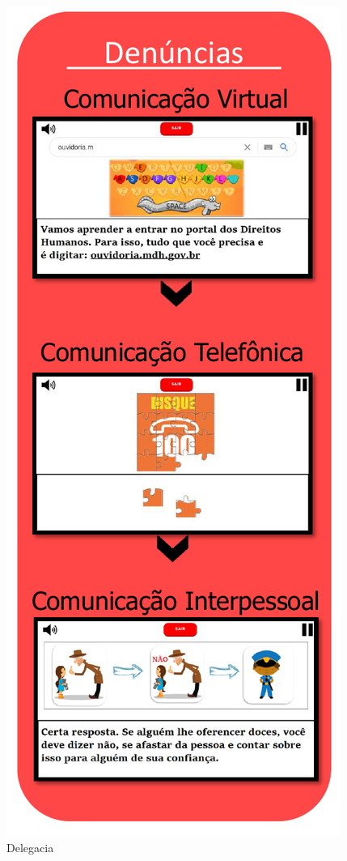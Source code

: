 \begin{figure}%
  \vspace{-20pt}
  \caption{\label{fig:DelegaciaDP}Delegacia}
  \includegraphics[width=\linewidth]{./Figuras/Delegacia.pdf}
  \vspace{-1.0cm}
\end{figure}

